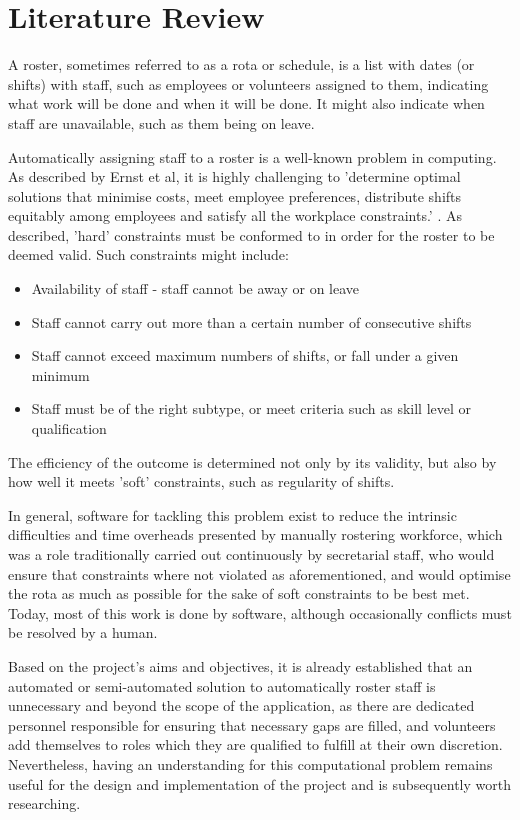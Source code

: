 \chapter{Literature Review}
A roster, sometimes referred to as a rota or schedule, is a list with dates (or shifts) with staff, such as employees or volunteers assigned to them, indicating what work will be done and when it will be done. It might also indicate when staff are unavailable, such as them being on leave. \cite{CollinsRoster}

Automatically assigning staff to a roster is a well-known problem in computing. As described by Ernst et al, it is highly challenging to 'determine optimal solutions that minimise costs, meet employee preferences, distribute shifts equitably among employees and satisfy all the workplace constraints.' \cite{ERNST20043}. As described, 'hard' constraints must be conformed to in order for the roster to be deemed valid. Such constraints might include: \cite{Chen2016}

\begin{itemize}
    \item Availability of staff - staff cannot be away or on leave
    \item Staff cannot carry out more than a certain number of consecutive shifts
    \item Staff cannot exceed maximum numbers of shifts, or fall under a given minimum
    \item Staff must be of the right subtype, or meet criteria such as skill level or qualification
\end{itemize}

The efficiency of the outcome is determined not only by its validity, but also by how well it meets 'soft' constraints, such as regularity of shifts.

In general, software for tackling this problem exist to reduce the intrinsic difficulties and time overheads presented by manually rostering workforce, which was a role traditionally carried out continuously by secretarial staff, who would ensure that constraints where not violated as aforementioned, and would optimise the rota as much as possible for the sake of soft constraints to be best met. Today, most of this work is done by software, although occasionally conflicts must be resolved by a human. \cite{Maes1994AgentsTR}

Based on the project's aims and objectives, it is already established that an automated or semi-automated solution to automatically roster staff is unnecessary and beyond the scope of the application, as there are dedicated personnel responsible for ensuring that necessary gaps are filled, and volunteers add themselves to roles which they are qualified to fulfill at their own discretion. Nevertheless, having an understanding for this computational problem remains useful for the design and implementation of the project and is subsequently worth researching.

